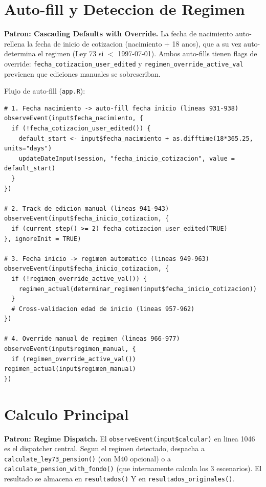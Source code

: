 \documentclass[11pt, letterpaper, twoside]{report}
\begin{document}
\section{Auto-fill y Deteccion de Regimen}
\label{sec:autofill}

\begin{patronbox}
\textbf{Patron: Cascading Defaults with Override.} La fecha de nacimiento
auto-rellena la fecha de inicio de cotizacion (nacimiento + 18 anos), que a su vez
auto-determina el regimen (Ley 73 si $<$ 1997-07-01). Ambos auto-fills tienen
flags de override: \texttt{fecha\_cotizacion\_user\_edited} y
\texttt{regimen\_override\_active\_val} previenen que ediciones manuales se
sobrescriban.
\end{patronbox}

\begin{codigobox}
Flujo de auto-fill (\texttt{app.R}):
\begin{lstlisting}[caption={Cascada fecha nacimiento -> regimen}]
# 1. Fecha nacimiento -> auto-fill fecha inicio (lineas 931-938)
observeEvent(input$fecha_nacimiento, {
  if (!fecha_cotizacion_user_edited()) {
    default_start <- input$fecha_nacimiento + as.difftime(18*365.25, units="days")
    updateDateInput(session, "fecha_inicio_cotizacion", value = default_start)
  }
})

# 2. Track de edicion manual (lineas 941-943)
observeEvent(input$fecha_inicio_cotizacion, {
  if (current_step() >= 2) fecha_cotizacion_user_edited(TRUE)
}, ignoreInit = TRUE)

# 3. Fecha inicio -> regimen automatico (lineas 949-963)
observeEvent(input$fecha_inicio_cotizacion, {
  if (!regimen_override_active_val()) {
    regimen_actual(determinar_regimen(input$fecha_inicio_cotizacion))
  }
  # Cross-validacion edad de inicio (lineas 957-962)
})

# 4. Override manual de regimen (lineas 966-977)
observeEvent(input$regimen_manual, {
  if (regimen_override_active_val()) regimen_actual(input$regimen_manual)
})
\end{lstlisting}
\end{codigobox}


\section{Calculo Principal}
\label{sec:calculo_principal}

\begin{patronbox}
\textbf{Patron: Regime Dispatch.} El \texttt{observeEvent(input\$calcular)} en
linea 1046 es el dispatcher central. Segun el regimen detectado, despacha
a \texttt{calculate\_ley73\_pension()} (con M40 opcional) o a
\texttt{calculate\_pension\_with\_fondo()} (que internamente calcula los 3 escenarios).
El resultado se almacena en \texttt{resultados()} Y en \texttt{resultados\_originales()}.
\end{patronbox}
\end{document}
